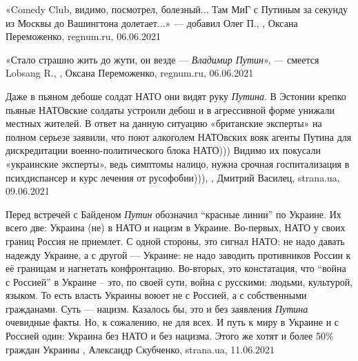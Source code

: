 «Comedy Club, видимо, посмотрел, болезный... Там МиГ с Путиным за секунду из
Москвы до Вашингтона долетает...» — добавил Олег П.,
, Оксана Переможенко, regnum.ru, 06.06.2021

«Стало страшно жить до жути, он везде — \emph{Владимир Путин}», — смеется Lobsang R.,
, Оксана Переможенко, regnum.ru, 06.06.2021

Даже в пьяном дебоше солдат НАТО они видят руку \emph{Путина}.  В Эстонии крепко
пьяные НАТОвские солдаты устроили дебош и в агрессивной форме унижали местных
жителей.  В ответ на данную ситуацию «британские эксперты» на полном серьезе
заявили, что поют алкоголем НАТОвских вояк агенты Путина для дискредитации
военно-политического блока НАТО))) Видимо их покусали «украинские эксперты»,
ведь симптомы налицо, нужна срочная госпитализация в психдиспансер и курс
лечения от русофобии))),
, Дмитрий Василец, strana.ua, 09.06.2021

Перед встречей с Байденом \emph{Путин} обозначил \enquote{красные линии} по
Украине. Их всего две: Украина (не) в НАТО и нацизм в Украине.  Во-первых, НАТО
у своих границ Россия не приемлет. С одной стороны, это сигнал НАТО: не надо
давать надежду Украине, а с другой — Украине: не надо заводить противников
России к её границам и нагнетать конфронтацию.  Во-вторых, это констатация, что
\enquote{война с Россией} в Украине – это, по своей сути, война с русскими:
людьми, культурой, языком. То есть власть Украины воюет не с Россией, а с
собственными гражданами. Суть — нацизм.  Казалось бы, это и без заявления
\emph{Путина} очевидные факты. Но, к сожалению, не для всех. И путь к миру в
Украине и с Россией один: Украина без НАТО и без нацизма. Этого же хотят и
более 50\% граждан Украины
, Александр Скубченко, strana.ua, 11.06.2021

